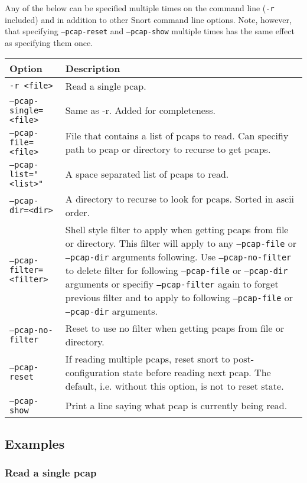 \documentclass[english]{report}
\begin{document}
Any of the below can be specified multiple times on the command line (\texttt{-r}
included) and in addition to other Snort command line options.  Note, however,
that specifying \texttt{--pcap-reset} and \texttt{--pcap-show} multiple times has
the same effect as specifying them once.

\begin{tabular}{| l | p{3.5in} |}
\hline
\textbf{Option} & \textbf{Description}\\
\hline 
\hline 
\texttt{-r <file>} & Read a single pcap. \\
\hline
\texttt{--pcap-single=<file>} & Same as -r.  Added for completeness. \\
\hline
\texttt{--pcap-file=<file>} & File that contains a list of pcaps to read.  Can specifiy path to pcap or directory to recurse to get pcaps. \\
\hline
\texttt{--pcap-list="<list>"} & A space separated list of pcaps to read. \\
\hline
\texttt{--pcap-dir=<dir>} & A directory to recurse to look for pcaps.  Sorted in ascii order. \\
\hline
\texttt{--pcap-filter=<filter>} & Shell style filter to apply when getting pcaps from file or directory.  This filter will apply to any \texttt{--pcap-file} or \texttt{--pcap-dir} arguments following.  Use \texttt{--pcap-no-filter} to delete filter for following \texttt{--pcap-file} or \texttt{--pcap-dir} arguments or specifiy \texttt{--pcap-filter} again to forget previous filter and to apply to following \texttt{--pcap-file} or \texttt{--pcap-dir} arguments. \\
\hline
\texttt{--pcap-no-filter} & Reset to use no filter when getting pcaps from file or directory. \\
\hline
\texttt{--pcap-reset} & If reading multiple pcaps, reset snort to post-configuration state before reading next pcap.  The default, i.e. without this option, is not to reset state. \\
\hline
\texttt{--pcap-show} & Print a line saying what pcap is currently being read. \\
\hline
\end{tabular}

\subsection{Examples}

\subsubsection{Read a single pcap}
\end{document}
